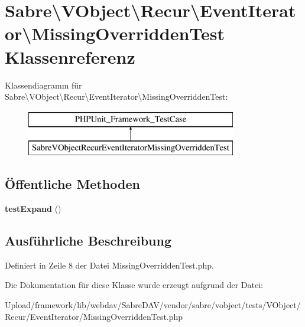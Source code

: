 \hypertarget{class_sabre_1_1_v_object_1_1_recur_1_1_event_iterator_1_1_missing_overridden_test}{}\section{Sabre\textbackslash{}V\+Object\textbackslash{}Recur\textbackslash{}Event\+Iterator\textbackslash{}Missing\+Overridden\+Test Klassenreferenz}
\label{class_sabre_1_1_v_object_1_1_recur_1_1_event_iterator_1_1_missing_overridden_test}
Klassendiagramm für Sabre\textbackslash{}V\+Object\textbackslash{}Recur\textbackslash{}Event\+Iterator\textbackslash{}Missing\+Overridden\+Test\+:\begin{figure}[H]
\begin{center}
\leavevmode
\includegraphics[height=2.000000cm]{class_sabre_1_1_v_object_1_1_recur_1_1_event_iterator_1_1_missing_overridden_test}
\end{center}
\end{figure}
\subsection*{Öffentliche Methoden}
\begin{DoxyCompactItemize}
\item 
\mbox{\label{class_sabre_1_1_v_object_1_1_recur_1_1_event_iterator_1_1_missing_overridden_test_a9c98025024c301b646ea5cc9590809b8}} 
{\bfseries test\+Expand} ()
\end{DoxyCompactItemize}


\subsection{Ausführliche Beschreibung}


Definiert in Zeile 8 der Datei Missing\+Overridden\+Test.\+php.



Die Dokumentation für diese Klasse wurde erzeugt aufgrund der Datei\+:\begin{DoxyCompactItemize}
\item 
Upload/framework/lib/webdav/\+Sabre\+D\+A\+V/vendor/sabre/vobject/tests/\+V\+Object/\+Recur/\+Event\+Iterator/Missing\+Overridden\+Test.\+php\end{DoxyCompactItemize}
